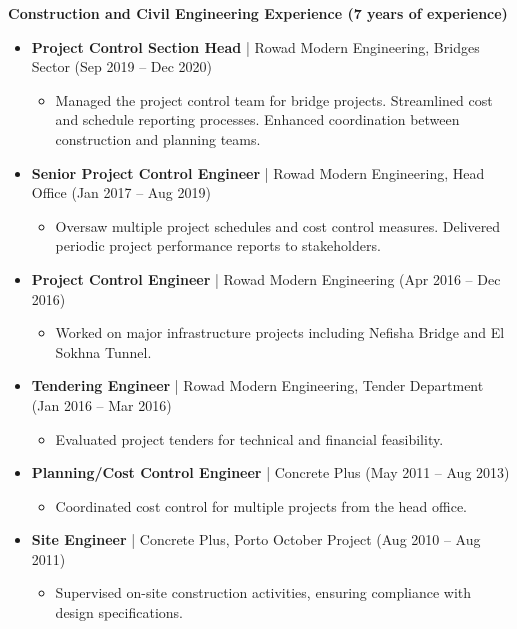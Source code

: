 \documentclass[10pt, letterpaper]{article}
\begin{document}
\newpage
\textbf{\textcolor{primaryColor}{Construction and Civil Engineering Experience (7 years of experience)}}
\begin{itemize}[leftmargin=*]
    \item \textbf{Project Control Section Head} | Rowad Modern Engineering, Bridges Sector (Sep 2019 – Dec 2020)
    \begin{itemize}[leftmargin=1cm]
        \item Managed the project control team for bridge projects. Streamlined cost and schedule reporting processes. Enhanced coordination between construction and planning teams.
    \end{itemize}
    \item \textbf{Senior Project Control Engineer} | Rowad Modern Engineering, Head Office (Jan 2017 – Aug 2019)
    \begin{itemize}[leftmargin=1cm]
        \item Oversaw multiple project schedules and cost control measures. Delivered periodic project performance reports to stakeholders.
    \end{itemize}
    \item \textbf{Project Control Engineer} | Rowad Modern Engineering (Apr 2016 – Dec 2016)
    \begin{itemize}[leftmargin=1cm]
        \item Worked on major infrastructure projects including Nefisha Bridge and El Sokhna Tunnel.
    \end{itemize}
    \item \textbf{Tendering Engineer} | Rowad Modern Engineering, Tender Department (Jan 2016 – Mar 2016)
    \begin{itemize}[leftmargin=1cm]
        \item Evaluated project tenders for technical and financial feasibility.
    \end{itemize}
    \item \textbf{Planning/Cost Control Engineer} | Concrete Plus (May 2011 – Aug 2013)
    \begin{itemize}[leftmargin=1cm]
        \item Coordinated cost control for multiple projects from the head office.
    \end{itemize}
    \item \textbf{Site Engineer} | Concrete Plus, Porto October Project (Aug 2010 – Aug 2011)
    \begin{itemize}[leftmargin=1cm]
        \item Supervised on-site construction activities, ensuring compliance with design specifications.
    \end{itemize}
\end{itemize}
\end{document}
